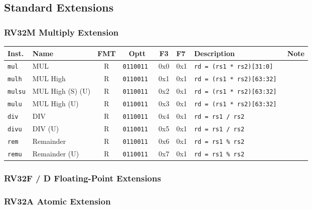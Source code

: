 \subsection*{Standard Extensions}

\subsubsection*{RV32M Multiply Extension}
\begin{tabular}
{l | l | c | c | c | l | l | l }
Inst.       & Name              & FMT   & Optt         & F3  & F7  & Description                     & Note\\ \hline
\tt{mul}  & MUL               & R     & \tt{0110011} & 0x0 & 0x1 & \tt{rd = (rs1 * rs2)[31:0]}   & \\
\tt{mulh} & MUL High          & R     & \tt{0110011} & 0x1 & 0x1 & \tt{rd = (rs1 * rs2)[63:32]}  & \\
\tt{mulsu}& MUL High (S) (U)  & R     & \tt{0110011} & 0x2 & 0x1 & \tt{rd = (rs1 * rs2)[63:32]}  & \\
\tt{mulu} & MUL High (U)      & R     & \tt{0110011} & 0x3 & 0x1 & \tt{rd = (rs1 * rs2)[63:32]}  & \\
\tt{div}  & DIV               & R     & \tt{0110011} & 0x4 & 0x1 & \tt{rd = rs1 / rs2}           & \\
\tt{divu} & DIV (U)           & R     & \tt{0110011} & 0x5 & 0x1 & \tt{rd = rs1 / rs2}           & \\
\tt{rem}  & Remainder         & R     & \tt{0110011} & 0x6 & 0x1 & \tt{rd = rs1 \% rs2}          & \\
\tt{remu} & Remainder (U)     & R     & \tt{0110011} & 0x7 & 0x1 & \tt{rd = rs1 \% rs2}          & \\
\end{tabular}

\subsubsection*{RV32F / D Floating-Point Extensions}

\subsubsection*{RV32A Atomic Extension}
